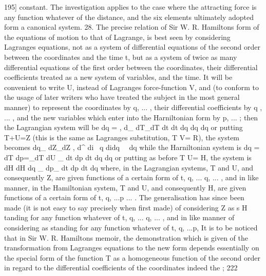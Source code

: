\documentclass[12pt,a4paper]{article}
\theoremstyle{definition}
\begin{document}

195]
constant. The investigation applies to the case where the attracting force is any
function whatever of the distance, and the six elements ultimately adopted form a
canonical system.
28. The precise relation of Sir W. R. Hamiltons form of the equations of motion
to that of Lagrange, is best seen by considering Lagranges equations, not as a system
of differential equations of the second order between the coordinates and the time t,
but as a system of twice as many differential equations of the first order between the
coordinates, their differential coefficients treated as a new system of variables, and the
time. It will be convenient to write U, instead of Lagranges force-function V, and
(to conform to the usage of later writers who have treated the subject in the most
general manner) to represent the coordinates by q, ... , their differential coefficients by
q , ... , and the new variables which enter into the Harniltonian form by p, ... ; then
the Lagrangian system will be
dq = , d_ dT_dT
dt dt dq dq dq
or putting T+U=Z (this is the same as Lagranges substitution, T V= R), the
system becomes
dq_ dZ_dZ
, d^
di~ q didq~ ~dq
while the Harniltonian system is
dq = dT dp=_dT dU
_
dt dp dt dq dq
or putting as before T U= H, the system is
dH dH
dq _ dp_
dt dp dt dq
where, in the Lagrangian systems, T and U, and consequently Z, are given functions
of a certain form of t, q, ... q, ... , and in like manner, in the Hamiltonian system,
T and U, and consequently H, are given functions of a certain form of t, q, ...p ... .
The generalisation has since been made (it is not easy to say precisely when first
made) of considering Z as s H tanding for any function whatever of t, q, ... q, ... , and in
like manner of considering as standing for any function whatever of t, q, ...p,
It is to be noticed that in Sir W. R. Hamiltons memoir, the demonstration which is
given of the transformation from Lagranges equations to the new form depends
essentially on the special form of the function T as a homogeneous function of the
second order in regard to the differential coefficients of the coordinates indeed the
; 222


\end{document}
